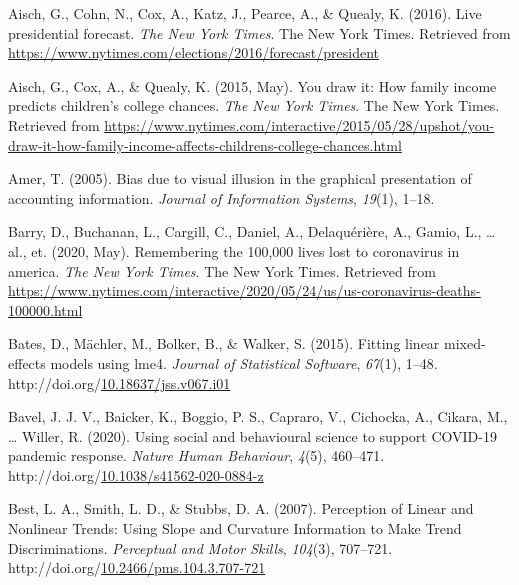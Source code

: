 \documentclass[print]{nuthesis}
\newlength{\cslhangindent}
\newenvironment{CSLReferences}%
{\setlength{\parindent}{0pt}%
\everypar{\setlength{\hangindent}{\cslhangindent}}\ignorespaces}%
{\par}
\begin{document}
\noindent

\setlength{\parindent}{-0.20in}
\setlength{\leftskip}{0.20in}
\setlength{\parskip}{8pt}

\hypertarget{refs}{}
\begin{CSLReferences}{1}{0}
\leavevmode\hypertarget{ref-NYTimes_presidential_forecast}{}%
Aisch, G., Cohn, N., Cox, A., Katz, J., Pearce, A., \& Quealy, K. (2016). Live presidential forecast. \emph{The New York Times}. The New York Times. Retrieved from \url{https://www.nytimes.com/elections/2016/forecast/president}

\leavevmode\hypertarget{ref-aisch_cox_quealy_2015}{}%
Aisch, G., Cox, A., \& Quealy, K. (2015, May). You draw it: How family income predicts children's college chances. \emph{The New York Times}. The New York Times. Retrieved from \url{https://www.nytimes.com/interactive/2015/05/28/upshot/you-draw-it-how-family-income-affects-childrens-college-chances.html}

\leavevmode\hypertarget{ref-amer2005bias}{}%
Amer, T. (2005). Bias due to visual illusion in the graphical presentation of accounting information. \emph{Journal of Information Systems}, \emph{19}(1), 1--18.

\leavevmode\hypertarget{ref-NYTrememberinglives}{}%
Barry, D., Buchanan, L., Cargill, C., Daniel, A., Delaquérière, A., Gamio, L., \ldots{} al., et. (2020, May). Remembering the 100,000 lives lost to coronavirus in america. \emph{The New York Times}. The New York Times. Retrieved from \url{https://www.nytimes.com/interactive/2020/05/24/us/us-coronavirus-deaths-100000.html}

\leavevmode\hypertarget{ref-lme4}{}%
Bates, D., Mächler, M., Bolker, B., \& Walker, S. (2015). Fitting linear mixed-effects models using {lme4}. \emph{Journal of Statistical Software}, \emph{67}(1), 1--48. http://doi.org/\href{https://doi.org/10.18637/jss.v067.i01}{10.18637/jss.v067.i01}

\leavevmode\hypertarget{ref-bavel_using_2020}{}%
Bavel, J. J. V., Baicker, K., Boggio, P. S., Capraro, V., Cichocka, A., Cikara, M., \ldots{} Willer, R. (2020). Using social and behavioural science to support {COVID}-19 pandemic response. \emph{Nature Human Behaviour}, \emph{4}(5), 460--471. http://doi.org/\href{https://doi.org/10.1038/s41562-020-0884-z}{10.1038/s41562-020-0884-z}

\leavevmode\hypertarget{ref-best_perception_2007}{}%
Best, L. A., Smith, L. D., \& Stubbs, D. A. (2007). Perception of {Linear} and {Nonlinear} {Trends}: {Using} {Slope} and {Curvature} {Information} to {Make} {Trend} {Discriminations}. \emph{Perceptual and Motor Skills}, \emph{104}(3), 707--721. http://doi.org/\href{https://doi.org/10.2466/pms.104.3.707-721}{10.2466/pms.104.3.707-721}


\end{CSLReferences}
\end{document}
